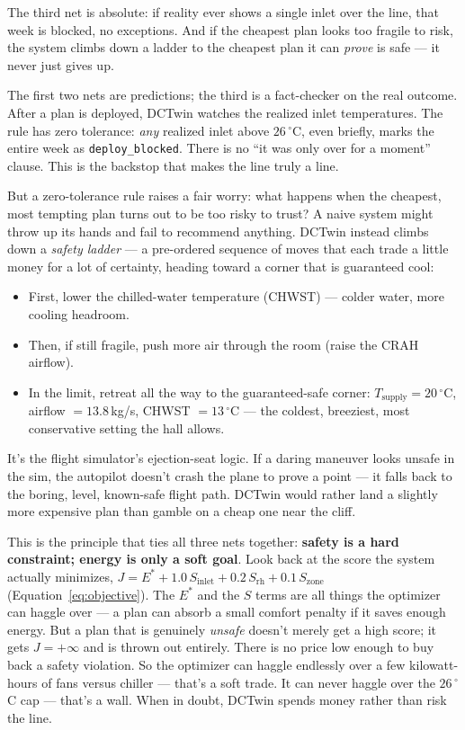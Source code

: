 \begin{keyidea}
The third net is absolute: if reality ever shows a single inlet over the line, that week is blocked, no exceptions. And if the cheapest plan looks too fragile to risk, the system climbs down a ladder to the cheapest plan it can \emph{prove} is safe --- it never just gives up.
\end{keyidea}

The first two nets are predictions; the third is a fact-checker on the real outcome. After a plan is deployed, DCTwin watches the realized inlet temperatures. The rule has zero tolerance: \emph{any} realized inlet above $26\,^\circ$C, even briefly, marks the entire week as \texttt{deploy\_blocked}. There is no ``it was only over for a moment'' clause. This is the backstop that makes the line truly a line.

But a zero-tolerance rule raises a fair worry: what happens when the cheapest, most tempting plan turns out to be too risky to trust? A naive system might throw up its hands and fail to recommend anything. DCTwin instead climbs down a \emph{safety ladder} --- a pre-ordered sequence of moves that each trade a little money for a lot of certainty, heading toward a corner that is guaranteed cool:

\begin{itemize}
  \item First, lower the chilled-water temperature (CHWST) --- colder water, more cooling headroom.
  \item Then, if still fragile, push more air through the room (raise the CRAH airflow).
  \item In the limit, retreat all the way to the guaranteed-safe corner: $T_{\text{supply}} = 20\,^{\circ}$C, airflow $= 13.8$\,kg/s, CHWST $= 13\,^{\circ}$C --- the coldest, breeziest, most conservative setting the hall allows.
\end{itemize}

\begin{analogy}
It's the flight simulator's ejection-seat logic. If a daring maneuver looks unsafe in the sim, the autopilot doesn't crash the plane to prove a point --- it falls back to the boring, level, known-safe flight path. DCTwin would rather land a slightly more expensive plan than gamble on a cheap one near the cliff.
\end{analogy}

This is the principle that ties all three nets together: \textbf{safety is a hard constraint; energy is only a soft goal}. Look back at the score the system actually minimizes, $J = E^{*} + 1.0\,S_{\text{inlet}} + 0.2\,S_{\text{rh}} + 0.1\,S_{\text{zone}}$ (Equation~\ref{eq:objective}). The $E^{*}$ and the $S$ terms are all things the optimizer can haggle over --- a plan can absorb a small comfort penalty if it saves enough energy. But a plan that is genuinely \emph{unsafe} doesn't merely get a high score; it gets $J = +\infty$ and is thrown out entirely. There is no price low enough to buy back a safety violation. So the optimizer can haggle endlessly over a few kilowatt-hours of fans versus chiller --- that's a soft trade. It can never haggle over the $26\,^\circ$C cap --- that's a wall. When in doubt, DCTwin spends money rather than risk the line.

